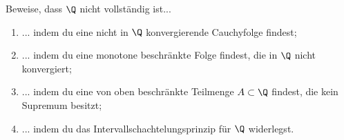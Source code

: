 \begin{prob}
  Beweise, dass $\Q$ nicht vollständig ist...
  \begin{enumerate}[label=(\alph*)]
  \item ... indem du eine nicht in $\Q$ konvergierende Cauchyfolge findest;
  \item ... indem du eine monotone beschränkte Folge findest, die in $\Q$ nicht
    konvergiert;
  \item ... indem du eine von oben beschränkte Teilmenge $A \subset \Q$ findest,
    die kein Supremum besitzt;
  \item ... indem du das Intervallschachtelungsprinzip für $\Q$ widerlegst.
  \end{enumerate}
\end{prob}
